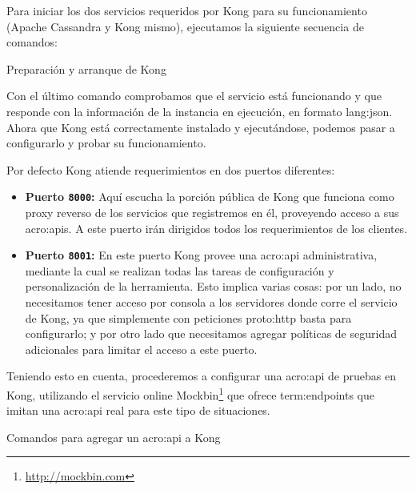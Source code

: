Para iniciar los dos servicios requeridos por Kong para su funcionamiento (Apache Cassandra y Kong mismo), ejecutamos la siguiente secuencia de comandos:

\begin{listing}[H]
  \caption{Preparación y arranque de Kong}
  \label{soa:tecnologias:kong:bash-preparacion}
\end{listing}

Con el último comando comprobamos que el servicio está funcionando y que responde con la información de la instancia en ejecución, en formato \gls{lang:json}. Ahora que Kong está correctamente instalado y ejecutándose, podemos pasar a configurarlo y probar su funcionamiento.

Por defecto Kong atiende requerimientos en dos puertos diferentes:

\begin{itemize}
  \item \textbf{Puerto \texttt{8000}:} Aquí escucha la porción pública de Kong que funciona como proxy reverso de los servicios que registremos en él, proveyendo acceso a sus \glspl{acro:api}. A este puerto irán dirigidos todos los requerimientos de los clientes.
  \item \textbf{Puerto \texttt{8001}:} En este puerto Kong provee una \gls{acro:api} administrativa, mediante la cual se realizan todas las tareas de configuración y personalización de la herramienta. Esto implica varias cosas: por un lado, no necesitamos tener acceso por consola a los servidores donde corre el servicio de Kong, ya que simplemente con peticiones \gls{proto:http} basta para configurarlo; y por otro lado que necesitamos agregar políticas de seguridad adicionales para limitar el acceso a este puerto.
\end{itemize}

Teniendo esto en cuenta, procederemos a configurar una \gls{acro:api} de pruebas en Kong, utilizando el servicio online Mockbin\footnote{\url{http://mockbin.com}} que ofrece \glspl{term:endpoint} que imitan una \gls{acro:api} real para este tipo de situaciones.

\begin{listing}[H]
  \caption{Comandos para agregar un \gls{acro:api} a Kong}
  \label{soa:tecnologias:kong:bash-agregar-mockbin}
\end{listing}

